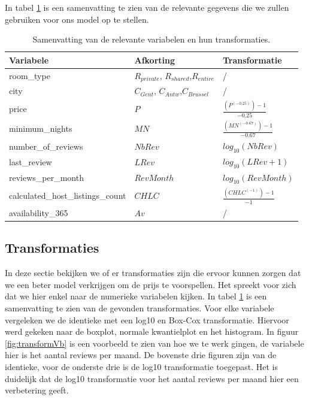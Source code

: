 \documentclass[a4paper,kulak]{kulakarticle} %
\begin{document}
In tabel \ref{tab:transformaties} is een samenvatting te zien van de relevante gegevens die we zullen gebruiken voor ons model op te stellen.
\begin{table}[!h]
	\centering
	\begin{tabular}{|l|l|l|}
		\hline 
		\textbf{Variabele} & \textbf{Afkorting}& \textbf{Transformatie} \\ 
		\hline 
		room\_type & $R_{private}$, $R_{shared}$,$R_{entire}$&/ \\ 
		city & $C_{Gent}$, $C_{Antw}$,$C_{Brussel}$&/ \\ 
		price & $P$&$\frac{(P^{(-0.25)}) - 1}{-0.25}$ \\ 
		minimum\_nights & $MN$&$\frac{(MN^{(-0.67)}) - 1}{-0.67}$ \\ 
		number\_of\_reviews & $NbRev$& $log_{10}(NbRev)$\\ 
		last\_review & $LRev$&$ log_{10}(LRev + 1) $\\
		reviews\_per\_month &$RevMonth$&$ log_{10}(RevMonth) $ \\
		calculated\_host\_listings\_count &$CHLC$& $\frac{(CHLC^{(-1)}) - 1}{-1}$\\
		availability\_365 & $Av$&/\\ \hline
	\end{tabular} 
	\caption{Samenvatting van de relevante variabelen en hun transformaties.}
	\label{tab:transformaties}
\end{table}
\subsection{Transformaties}
In deze sectie bekijken we of er transformaties zijn die ervoor kunnen zorgen dat we een beter model verkrijgen om de prijs te voorspellen. Het spreekt voor zich dat we hier enkel naar de numerieke variabelen kijken. In tabel \ref{tab:transformaties} is een samenvatting te zien van de gevonden transformaties. Voor elke variabele vergeleken we de identieke met een log10 en Box-Cox transformatie. Hiervoor werd gekeken naar de boxplot, normale kwantielplot en het histogram. In figuur \ref{fig:transformVb} is een voorbeeld te zien van hoe we te werk gingen, de variabele hier is het aantal reviews per maand. De bovenste drie figuren zijn van de identieke, voor de onderste drie is de log10 transformatie toegepast. Het is duidelijk dat de log10 transformatie voor het aantal reviews per maand hier een verbetering geeft.
\end{document}
